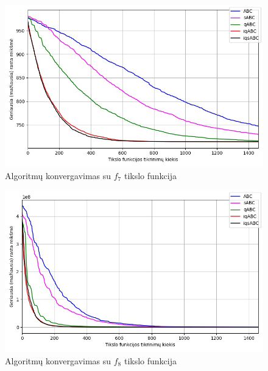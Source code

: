 \documentclass{VUMIFPSmagistrinis}
\begin{document}
\begin{landscape}
\begin{multicols}{2}
\begin{figure}[H]
    \centering
    \includegraphics[scale=0.45]{img/2kv/all_f7.jpg}
    \caption{Algoritmų konvergavimas su $f_{7}$ tikslo funkcija}
    \label{img:konf7}
\end{figure}


\begin{figure}[H]
    \centering
    \includegraphics[scale=0.45]{img/2kv/all_f8.jpg}
    \caption{Algoritmų konvergavimas su $f_{8}$ tikslo funkcija}
    \label{img:konf8}
\end{figure}





\end{multicols}
\begin{multicols}{2}


\end{multicols}
\end{landscape}
\end{document}
